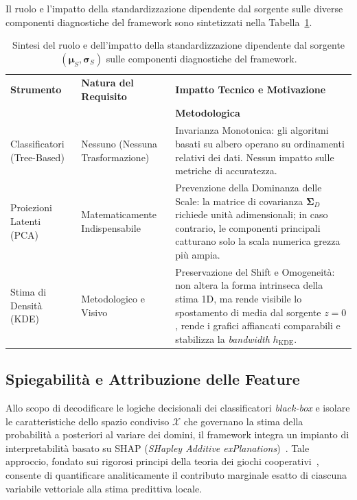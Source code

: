 Il ruolo e l'impatto della standardizzazione dipendente dal sorgente sulle diverse componenti diagnostiche del framework sono sintetizzati nella Tabella~\ref{tab:confronto_scaling_pca_kde}.

\begin{table}[H]
\centering
\caption{Sintesi del ruolo e dell'impatto della standardizzazione dipendente dal sorgente $(\boldsymbol{\mu}_S, \boldsymbol{\sigma}_S)$ sulle componenti diagnostiche del framework.}
\label{tab:confronto_scaling_pca_kde}
\begin{tabularx}{\textwidth}{>{\raggedright\arraybackslash}p{3.2cm} >{\raggedright\arraybackslash}X >{\raggedright\arraybackslash}X }
\toprule
\textbf{Strumento}  & \textbf{Natura del Requisito} & \textbf{Impatto Tecnico e Motivazione} \\[-5pt]
                    &                               & \textbf{Metodologica} \\
\midrule
Classificatori (Tree-Based) &
Nessuno (Nessuna Trasformazione) &
Invarianza Monotonica: gli algoritmi basati su albero operano su ordinamenti relativi dei dati. Nessun impatto sulle metriche di accuratezza. \\
\addlinespace
Proiezioni Latenti (PCA) &
Matematicamente Indispensabile &
Prevenzione della Dominanza delle Scale: la matrice di covarianza $\boldsymbol{\Sigma}_D$ richiede unità adimensionali; in caso contrario, le componenti principali catturano solo la scala numerica grezza più ampia. \\
\addlinespace
Stima di Densità (KDE) &
Metodologico e Visivo &
Preservazione del Shift e Omogeneità: non altera la forma intrinseca della stima 1D, ma rende visibile lo spostamento di media dal sorgente $z=0$, rende i grafici affiancati comparabili e stabilizza la \textit{bandwidth} $h_{\text{KDE}}$. \\
\bottomrule
\end{tabularx}
\end{table}

\subsection{Spiegabilità e Attribuzione delle Feature}
\label{subsec:spiegabilita_shap}

Allo scopo di decodificare le logiche decisionali dei classificatori \textit{black-box} e isolare le caratteristiche dello spazio condiviso $\mathcal{X}$ che governano la stima della probabilità a posteriori al variare dei domini, il framework integra un impianto di interpretabilità basato su SHAP (\textit{SHapley Additive exPlanations})~\cite{lundberg2017}. Tale approccio, fondato sui rigorosi principi della teoria dei giochi cooperativi~\cite{shapley1953}, consente di quantificare analiticamente il contributo marginale esatto di ciascuna variabile vettoriale alla stima predittiva locale.

